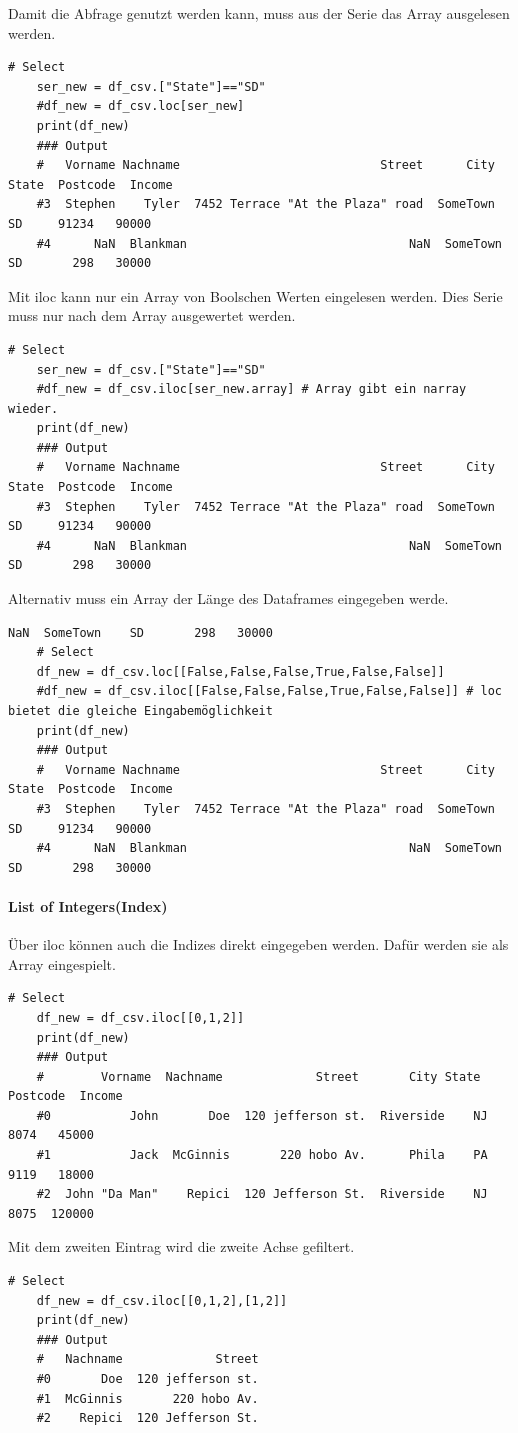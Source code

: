 Damit die Abfrage genutzt werden kann, muss aus der Serie das Array ausgelesen werden.
\begin{lstlisting}[style=python]
	# Select
	ser_new = df_csv.["State"]=="SD"
	#df_new = df_csv.loc[ser_new]
	print(df_new)
	### Output
	#   Vorname Nachname                            Street      City State  Postcode  Income
	#3  Stephen    Tyler  7452 Terrace "At the Plaza" road  SomeTown    SD     91234   90000
	#4      NaN  Blankman                               NaN  SomeTown    SD       298   30000
\end{lstlisting}
Mit iloc kann nur ein Array von Boolschen Werten eingelesen werden. Dies Serie muss nur nach dem Array ausgewertet werden.
\begin{lstlisting}[style=python]
	# Select
	ser_new = df_csv.["State"]=="SD"
	#df_new = df_csv.iloc[ser_new.array] # Array gibt ein narray wieder.
	print(df_new)
	### Output
	#   Vorname Nachname                            Street      City State  Postcode  Income
	#3  Stephen    Tyler  7452 Terrace "At the Plaza" road  SomeTown    SD     91234   90000
	#4      NaN  Blankman                               NaN  SomeTown    SD       298   30000
\end{lstlisting}
Alternativ muss ein Array der Länge des Dataframes eingegeben werde.
\begin{lstlisting}[style=python]                          NaN  SomeTown    SD       298   30000
	# Select 
	df_new = df_csv.loc[[False,False,False,True,False,False]]
	#df_new = df_csv.iloc[[False,False,False,True,False,False]] # loc bietet die gleiche Eingabemöglichkeit
	print(df_new)
	### Output
	#   Vorname Nachname                            Street      City State  Postcode  Income
	#3  Stephen    Tyler  7452 Terrace "At the Plaza" road  SomeTown    SD     91234   90000
	#4      NaN  Blankman                               NaN  SomeTown    SD       298   30000
\end{lstlisting}

\paragraph*{List of Integers(Index)}
Über iloc können auch die Indizes direkt eingegeben werden. Dafür werden sie als Array eingespielt.
\begin{lstlisting}[style=python]
	# Select
	df_new = df_csv.iloc[[0,1,2]]
	print(df_new)
	### Output
	#      	 Vorname  Nachname             Street       City State  Postcode  Income
	#0           John       Doe  120 jefferson st.  Riverside    NJ      8074   45000
	#1           Jack  McGinnis       220 hobo Av.      Phila    PA      9119   18000
	#2  John "Da Man"    Repici  120 Jefferson St.  Riverside    NJ      8075  120000
\end{lstlisting}
Mit dem zweiten Eintrag wird die zweite Achse gefiltert.
\begin{lstlisting}[style=python]
	# Select
	df_new = df_csv.iloc[[0,1,2],[1,2]]
	print(df_new)
	### Output
	#   Nachname             Street
	#0       Doe  120 jefferson st.
	#1  McGinnis       220 hobo Av.
	#2    Repici  120 Jefferson St.
\end{lstlisting}
